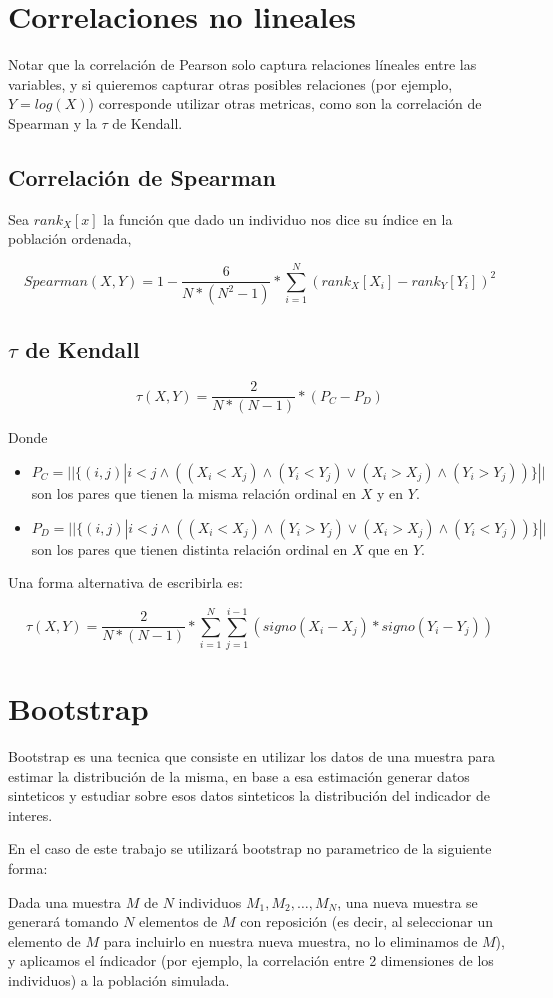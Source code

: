 \section{Correlaciones no lineales}

Notar que la correlación de Pearson solo captura relaciones líneales entre las variables, y si quieremos capturar otras posibles relaciones (por ejemplo, $Y = log(X)$) corresponde utilizar otras metricas, como son la correlación de Spearman y la $\tau$ de Kendall.

\subsection{Correlación de Spearman}

Sea $rank_X[x]$ la función que dado un individuo nos dice su índice en la población ordenada,

$$
    Spearman(X,Y) = 1 - \frac{6}{N*(N^2-1)} * \sum_{i=1}^N (rank_X[X_i]-rank_Y[Y_i])^2
$$

\subsection{$\tau$ de Kendall}

$$
    \tau(X,Y) = \frac{2}{N*(N-1)} * ( P_C - P_D )
$$

Donde 

\begin{itemize}
    \item $P_C = ||\{(i,j)| i<j \wedge ( (X_i < X_j) \wedge (Y_i < Y_j) \vee (X_i > X_j) \wedge (Y_i > Y_j))\}||$ son los pares que tienen la misma relación ordinal en $X$ y en $Y$.
    \item $P_D = ||\{(i,j)| i<j \wedge ( (X_i < X_j) \wedge (Y_i > Y_j) \vee (X_i > X_j) \wedge (Y_i < Y_j))\}||$ son los pares que tienen distinta relación ordinal en $X$ que en $Y$.
\end{itemize}

Una forma alternativa de escribirla es:

$$
    \tau(X,Y) = \frac{2}{N*(N-1)} * \sum_{i=1}^{N} \sum_{j=1}^{i-1} (signo(X_i-X_j) * signo(Y_i-Y_j))
$$

\section{Bootstrap}

Bootstrap es una tecnica que consiste en utilizar los datos de una muestra para estimar la distribución de la misma, en base a esa estimación generar datos sinteticos y estudiar sobre esos datos sinteticos la distribución del indicador de interes.

En el caso de este trabajo se utilizará bootstrap no parametrico de la siguiente forma:

Dada una muestra $M$ de $N$ individuos $M_1, M_2, \dots, M_N$, una nueva muestra se generará tomando $N$ elementos de $M$ con reposición (es decir, al seleccionar un elemento de $M$ para incluirlo en nuestra nueva muestra, no lo eliminamos de $M$), y aplicamos el índicador (por ejemplo, la correlación entre 2 dimensiones de los individuos) a la población simulada. 
